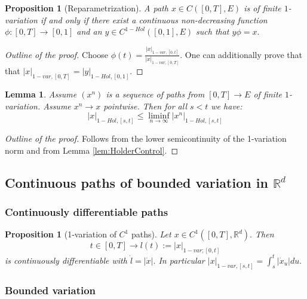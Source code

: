 \documentclass{article}
\newcommand{\R}{\mathbb{R}}
\newtheorem{prop}[theorem]{Proposition}
\newtheorem{lemma}[theorem]{Lemma}
\begin{document}
\begin{prop}[Reparametrization]
    A path $x \in C([0,T], E)$ is of finite $1$-variation if and only if there exist a continuous non-decreasing function $\phi:[0,T] \rightarrow [0,1]$ and an $y \in C^{1-Hol}([0,1], E)$ such that $y\phi= x.$
\end{prop}
\begin{proof}[Outline of the proof]
    Choose $\phi(t) = \frac{|x|_{1-var,[0,t]}}{|x|_{1-var,[0,T]}}$.
    One can additionally prove that that $|x|_{1-var,[0,T]}=|y|_{1-Hol,[0,1]}$.
\end{proof}

\begin{lemma}
    Assume $(x^n)$ is a sequence of paths from $[0,T] \rightarrow E$ of finite $1$-variation. Assume $x^n \rightarrow x$ pointwise. Then for all $s < t$ we have:
    \begin{equation}
        |x|_{1-Hol, [s,t]} \leq \liminf_{n \rightarrow \infty} |x^n|_{1-Hol, [s,t]}
    \end{equation}
\end{lemma}
\begin{proof}[Outline of the proof]
    Follows from the lower semicontinuity of the 1-variation norm and from Lemma \ref{lem:HolderControl}.
\end{proof}

\subsection{Continuous paths of bounded variation in $\R^d$}

\subsubsection{Continuously differentiable paths}

\begin{prop}[1-variation of $C^1$ paths]
    Let $x \in C^1([0,T], \R^d).$ Then 
    \begin{equation}
        t \in [0,T] \rightarrow l(t) := |x|_{1-var; [0,t]}
    \end{equation}
    is continuously differentiable with $\dot{l} = |\dot{x}|.$
    In particular $|x|_{1-var, [s,t]} = \int_s^t |\dot{x}_u| du.$
\end{prop}

\subsubsection{Bounded variation}
\end{document}
